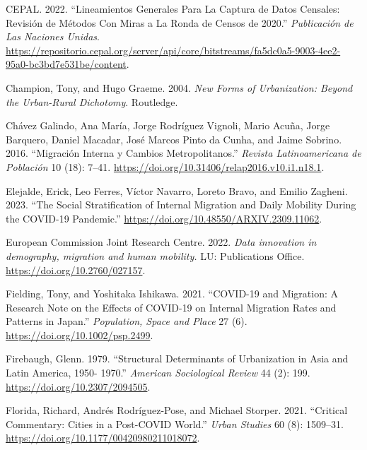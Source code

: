 \documentclass[
  11pt,
]{article}
\newlength{\cslhangindent}
\newlength{\cslentryspacingunit} %
\newenvironment{CSLReferences}[2] %
 {%
  \setlength{\parindent}{0pt}
  \ifodd #1
  \let\oldpar\par
  \def\par{\hangindent=\cslhangindent\oldpar}
  \fi
  \setlength{\parskip}{#2\cslentryspacingunit}
 }%
 {}
\begin{document}
\begin{CSLReferences}{1}{0}
\leavevmode{}%
CEPAL. 2022. {``Lineamientos Generales Para La Captura de Datos
Censales: Revisión de Métodos Con Miras a La Ronda de Censos de 2020.''}
\emph{Publicación de Las Naciones Unidas}.
\url{https://repositorio.cepal.org/server/api/core/bitstreams/fa5dc0a5-9003-4ee2-95a0-bc3bd7e531be/content}.

\leavevmode{}%
Champion, Tony, and Hugo Graeme. 2004. \emph{New Forms of Urbanization:
Beyond the Urban-Rural Dichotomy}. Routledge.

\leavevmode{}%
Chávez Galindo, Ana María, Jorge Rodríguez Vignoli, Mario Acuña, Jorge
Barquero, Daniel Macadar, José Marcos Pinto da Cunha, and Jaime Sobrino.
2016. {``Migración Interna y Cambios Metropolitanos.''} \emph{Revista
Latinoamericana de Población} 10 (18): 7--41.
\url{https://doi.org/10.31406/relap2016.v10.i1.n18.1}.

\leavevmode{}%
Elejalde, Erick, Leo Ferres, Víctor Navarro, Loreto Bravo, and Emilio
Zagheni. 2023. {``The Social Stratification of Internal Migration and
Daily Mobility During the COVID-19 Pandemic.''}
\url{https://doi.org/10.48550/ARXIV.2309.11062}.

\leavevmode{}%
European Commission Joint Research Centre. 2022. \emph{Data innovation
in demography, migration and human mobility.} LU: Publications Office.
\url{https://doi.org/10.2760/027157}.

\leavevmode{}%
Fielding, Tony, and Yoshitaka Ishikawa. 2021. {``COVID{-}19 and
Migration: A Research Note on the Effects of COVID{-}19 on Internal
Migration Rates and Patterns in Japan.''} \emph{Population, Space and
Place} 27 (6). \url{https://doi.org/10.1002/psp.2499}.

\leavevmode{}%
Firebaugh, Glenn. 1979. {``Structural Determinants of Urbanization in
Asia and Latin America, 1950- 1970.''} \emph{American Sociological
Review} 44 (2): 199. \url{https://doi.org/10.2307/2094505}.

\leavevmode{}%
Florida, Richard, Andrés Rodríguez-Pose, and Michael Storper. 2021.
{``Critical Commentary: Cities in a Post-COVID World.''} \emph{Urban
Studies} 60 (8): 1509--31.
\url{https://doi.org/10.1177/00420980211018072}.


\end{CSLReferences}
\end{document}
